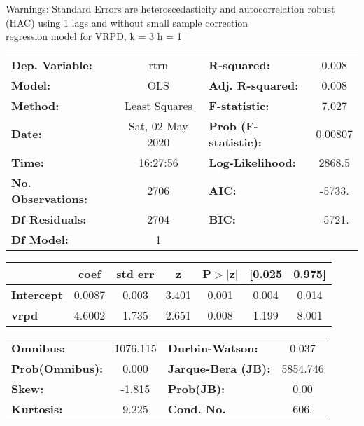 Warnings: \newline
 [1] Standard Errors are heteroscedasticity and autocorrelation robust (HAC) using 1 lags and without small sample correction\\ 

regression model for VRPD, k = 3 h = 1\begin{center}
\begin{tabular}{lclc}
\toprule
\textbf{Dep. Variable:}    &       rtrn       & \textbf{  R-squared:         } &     0.008   \\
\textbf{Model:}            &       OLS        & \textbf{  Adj. R-squared:    } &     0.008   \\
\textbf{Method:}           &  Least Squares   & \textbf{  F-statistic:       } &     7.027   \\
\textbf{Date:}             & Sat, 02 May 2020 & \textbf{  Prob (F-statistic):} &  0.00807    \\
\textbf{Time:}             &     16:27:56     & \textbf{  Log-Likelihood:    } &    2868.5   \\
\textbf{No. Observations:} &        2706      & \textbf{  AIC:               } &    -5733.   \\
\textbf{Df Residuals:}     &        2704      & \textbf{  BIC:               } &    -5721.   \\
\textbf{Df Model:}         &           1      & \textbf{                     } &             \\
\bottomrule
\end{tabular}
\begin{tabular}{lcccccc}
                   & \textbf{coef} & \textbf{std err} & \textbf{z} & \textbf{P$> |$z$|$} & \textbf{[0.025} & \textbf{0.975]}  \\
\midrule
\textbf{Intercept} &       0.0087  &        0.003     &     3.401  &         0.001        &        0.004    &        0.014     \\
\textbf{vrpd}      &       4.6002  &        1.735     &     2.651  &         0.008        &        1.199    &        8.001     \\
\bottomrule
\end{tabular}
\begin{tabular}{lclc}
\textbf{Omnibus:}       & 1076.115 & \textbf{  Durbin-Watson:     } &    0.037  \\
\textbf{Prob(Omnibus):} &   0.000  & \textbf{  Jarque-Bera (JB):  } & 5854.746  \\
\textbf{Skew:}          &  -1.815  & \textbf{  Prob(JB):          } &     0.00  \\
\textbf{Kurtosis:}      &   9.225  & \textbf{  Cond. No.          } &     606.  \\
\bottomrule
\end{tabular}
\end{center}

